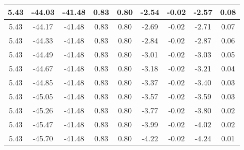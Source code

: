 \begin{table}[htbp]
\begin{adjustbox}{angle=90}
\begin{tabular}{|c|c|c|c|c|c|c|c|c|}
 5.43 & -44.03 & -41.48 & 0.83 & 0.80 & -2.54 & -0.02 & -2.57 & 0.08\\ \hline
 5.43 & -44.17 & -41.48 & 0.83 & 0.80 & -2.69 & -0.02 & -2.71 & 0.07\\ \hline
 5.43 & -44.33 & -41.48 & 0.83 & 0.80 & -2.84 & -0.02 & -2.87 & 0.06\\ \hline
 5.43 & -44.49 & -41.48 & 0.83 & 0.80 & -3.01 & -0.02 & -3.03 & 0.05\\ \hline
 5.43 & -44.67 & -41.48 & 0.83 & 0.80 & -3.18 & -0.02 & -3.21 & 0.04\\ \hline
 5.43 & -44.85 & -41.48 & 0.83 & 0.80 & -3.37 & -0.02 & -3.40 & 0.03\\ \hline
 5.43 & -45.05 & -41.48 & 0.83 & 0.80 & -3.57 & -0.02 & -3.59 & 0.03\\ \hline
 5.43 & -45.26 & -41.48 & 0.83 & 0.80 & -3.77 & -0.02 & -3.80 & 0.02\\ \hline
 5.43 & -45.47 & -41.48 & 0.83 & 0.80 & -3.99 & -0.02 & -4.02 & 0.02\\ \hline
 5.43 & -45.70 & -41.48 & 0.83 & 0.80 & -4.22 & -0.02 & -4.24 & 0.01\\ \hline
            \end{tabular}
        \end{adjustbox}
        \caption{}
        \label{}
    \end{table}
    
